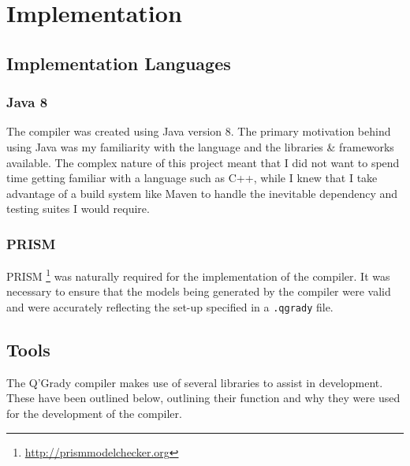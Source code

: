 \documentclass[report.tex]{subfiles}
\begin{document}
\chapter{Implementation} %
\label{cha:implementation}


\section{Implementation Languages} %
\label{sec:implementation_languages}

\subsection{Java 8} %
\label{sub:java_8}
The compiler was created using Java version 8. The primary motivation behind
using Java was my familiarity with the language and the libraries \& frameworks
available. The complex nature of this project meant that I did not want to spend
time getting familiar with a language such as C++, while I knew that I take
advantage of a build system like Maven to handle the inevitable dependency and
testing suites I would require.

\subsection{PRISM} %
\label{sub:prism}
PRISM \footnote{\url{http://prismmodelchecker.org}} was naturally required for
the implementation of the compiler. It was necessary to ensure that the models
being generated by the compiler were valid and were accurately reflecting the
set-up specified in a \texttt{.qgrady} file.


\section{Tools} %
\label{sec:tools}
The Q'Grady compiler makes use of several libraries to assist in development.
These have been outlined below, outlining their function and why they were used
for the development of the compiler.
\end{document}
